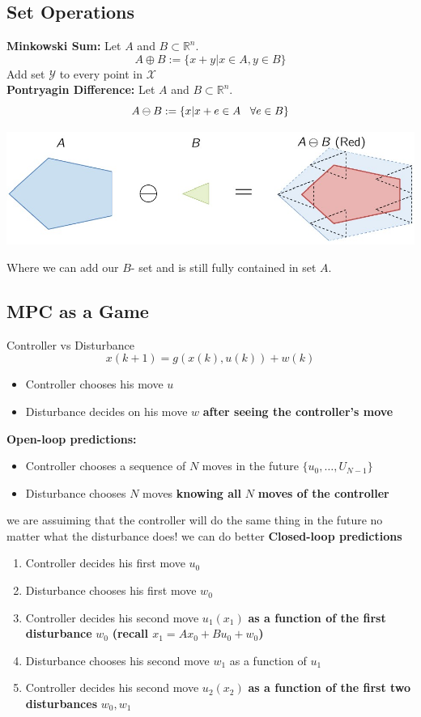     \subsection{Set Operations}
    \textbf{Minkowski Sum:} Let $A$ and $B\subset\mathbb{R}^n$. 
    \[A\oplus B := \{x+y | x \in A,y\in B\}\]
    Add set $\mathcal{Y}$ to every point in $\mathcal{X}$\\
    \textbf{Pontryagin Difference:} Let $A$ and $B\subset\mathbb{R}^n$. 
     \[A\ominus B := \{x|x+e\in A \hspace{3mm}\forall e \in B\}\]
     \begin{center}
     \includegraphics[width=0.7\linewidth]{MPC_summary/Images/PontryaginDiff.jpg}
     \end{center}
     Where we can add our $B$- set and is still fully contained in set $A$.
    \subsection{MPC as  a Game}
    Controller vs Disturbance
    \[x(k+1)= g(x(k),u(k))+w(k)\]
    \begin{itemize}
        \item Controller chooses his move $u$
        \item Disturbance decides on his move $w$ \textbf{after seeing the controller's move}
    \end{itemize}
    \textbf{Open-loop predictions:}
    \begin{itemize}
        \item Controller chooses a sequence of $N$ moves in the future $\{u_0,\dots, U_{N-1}\}$
        \item Disturbance chooses $N$ moves \textbf{knowing all} $N$ \textbf{moves of the controller}
    \end{itemize} 
    we are assuiming that the controller will do the same thing in the future no matter what the disturbance does!
    we can do better 
    \textbf{Closed-loop predictions}
    \begin{enumerate}
        \item Controller decides his first move $u_0$
        \item Disturbance chooses his first move $w_0$
        \item Controller decides his second move $u_1(x_1)$ \textbf{as a function of the first disturbance} $w_0$ \textbf{(recall $x_1=Ax_0+Bu_0+w_0$)}
        \item Disturbance chooses his second move $w_1$ as a function of $u_1$
        \item Controller decides his second move $u_2(x_2)$ \textbf{as a function of the first two disturbances} $w_0, w_1$
    \end{enumerate}
